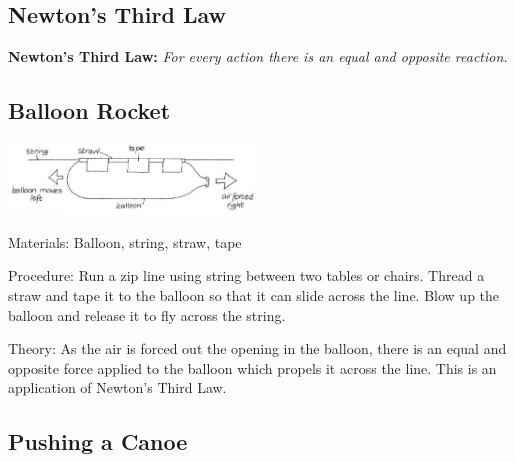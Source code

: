 \begin{multicols}{2}

\section*{Newton's Third Law} 
\textbf{Newton's Third Law: }\emph{For every action there is an equal and opposite reaction.}

\subsection{Balloon Rocket} 

\begin{center}
\includegraphics[width=0.49\textwidth]{./img/vso/balloon-rocket.jpg}
\end{center}

\begin{description*}
\item[Materials:]{Balloon, string, straw, tape}
\item[Procedure:]{Run a zip line using string between two tables or chairs. Thread a straw and tape it to the balloon so that it can slide across the line. Blow up the balloon and release it to fly across the string.}
\item[Theory:]{As the air is forced out the opening in the balloon, there is an equal and opposite force applied to the balloon which propels it across the line. This is an application of Newton's Third Law.}
\end{description*}

\subsection{Pushing a Canoe}


\end{multicols}
